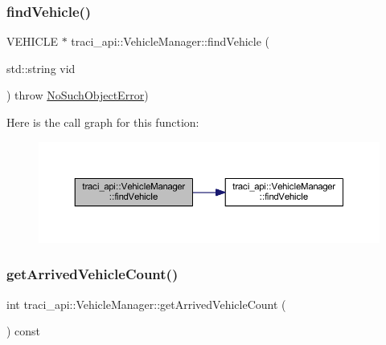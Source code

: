 \subsubsection{\texorpdfstring{find\+Vehicle()}{findVehicle()}\hspace{0.1cm}{\footnotesize\ttfamily [2/2]}}
{\footnotesize\ttfamily V\+E\+H\+I\+C\+LE $\ast$ traci\+\_\+api\+::\+Vehicle\+Manager\+::find\+Vehicle (\begin{DoxyParamCaption}\item[{std\+::string}]{vid }\end{DoxyParamCaption}) throw  \hyperlink{classtraci__api_1_1_no_such_object_error}{No\+Such\+Object\+Error}) }

Here is the call graph for this function\+:
\nopagebreak
\begin{figure}[H]
\begin{center}
\leavevmode
\includegraphics[width=350pt]{classtraci__api_1_1_vehicle_manager_a4fc72da33abd7a0323fd27c7721ba3ef_cgraph}
\end{center}
\end{figure}
\mbox{\label{classtraci__api_1_1_vehicle_manager_a193c8fa0b8778c496b23fc114653ebfa}} 
\subsubsection{\texorpdfstring{get\+Arrived\+Vehicle\+Count()}{getArrivedVehicleCount()}}
{\footnotesize\ttfamily int traci\+\_\+api\+::\+Vehicle\+Manager\+::get\+Arrived\+Vehicle\+Count (\begin{DoxyParamCaption}{ }\end{DoxyParamCaption}) const}

